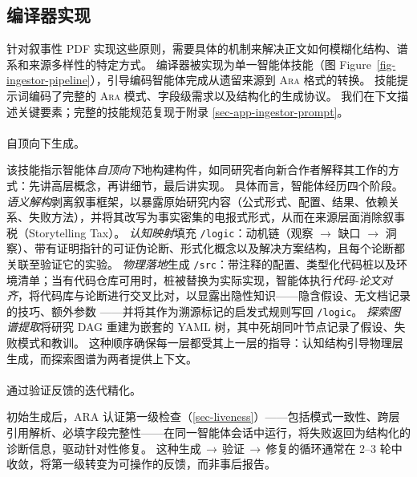 \documentclass[
]{article}
\makeatletter
\let\oldparagraph\paragraph
\renewcommand{\paragraph}{
    \@ifstar
      \xxxParagraphStar
      \xxxParagraphNoStar
  }
\newcommand{\xxxParagraphStar}[1]{\oldparagraph*{#1}\mbox{}}
\newcommand{\xxxParagraphNoStar}[1]{\oldparagraph{#1}\mbox{}}
\newcommand{\passthrough}[1]{#1}
\theoremstyle{definition}
\newcommand{\ara}{\textsc{Ara}}
\makeatother
\begin{document}
\subsection{编译器实现}\label{sec-ingestion-skill}

针对叙事性 PDF
实现这些原则，需要具体的机制来解决正文如何模糊化结构、谱系和来源多样性的特定方式。
编译器被实现为单一智能体技能（图
Figure~\ref{fig-ingestor-pipeline}），引导编码智能体完成从遗留来源到
\ara{} 格式的转换。 技能提示词编码了完整的 \ara{}
模式、字段级需求以及结构化的生成协议。
我们在下文描述关键要素；完整的技能规范复现于附录
\ref{sec-app-ingestor-prompt}。

\paragraph{自顶向下生成。}\label{ux81eaux9876ux5411ux4e0bux751fux6210}

该技能指示智能体\emph{自顶向下}地构建构件，如同研究者向新合作者解释其工作的方式：先讲高层概念，再讲细节，最后讲实现。
具体而言，智能体经历四个阶段。
\emph{语义解构}剥离叙事框架，以暴露原始研究内容（公式形式、配置、结果、依赖关系、失败方法），并将其改写为事实密集的电报式形式，从而在来源层面消除叙事税（Storytelling
Tax）。 \emph{认知映射}填充
\passthrough{\lstinline!/logic!}：动机链（观察 \(\to\) 缺口 \(\to\)
洞察）、带有证明指针的可证伪论断、形式化概念以及解决方案结构，且每个论断都关联至验证它的实验。
\emph{物理落地}生成
\passthrough{\lstinline!/src!}：带注释的配置、类型化代码桩以及环境清单；当有代码仓库可用时，桩被替换为实际实现，智能体执行\emph{代码-论文对齐}，将代码库与论断进行交叉比对，以显露出隐性知识------隐含假设、无文档记录的技巧、额外参数
\citep{li2026tacit}------并将其作为溯源标记的启发式规则写回
\passthrough{\lstinline!/logic!}。 \emph{探索图谱提取}将研究 DAG
重建为嵌套的 YAML 树，其中死胡同叶节点记录了假设、失败模式和教训。
这种顺序确保每一层都受其上一层的指导：认知结构引导物理层生成，而探索图谱为两者提供上下文。

\paragraph{通过验证反馈的迭代精化。}\label{ux901aux8fc7ux9a8cux8bc1ux53cdux9988ux7684ux8fedux4ee3ux7cbeux5316}

初始生成后，ARA
认证第一级检查（\ref{sec-liveness}）------包括模式一致性、跨层引用解析、必填字段完整性------在同一智能体会话中运行，将失败返回为结构化的诊断信息，驱动针对性修复。
这种生成\(\,\to\,\)验证\(\,\to\,\)修复的循环通常在 2--3
轮中收敛，将第一级转变为可操作的反馈，而非事后报告。
\end{document}
